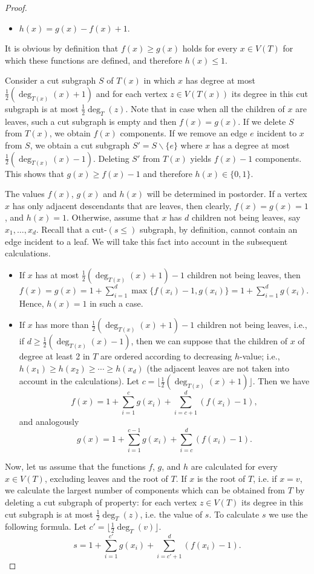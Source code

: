 \documentclass{article}
\theoremstyle{definition}
\begin{document}
\begin{proof}
\begin{itemize}
\item $h(x) = g(x) - f(x) + 1$.
 \end{itemize}
It is obvious by definition that $f(x) \geq g(x)$ holds for every $x \in V(T)$ for which these functions are defined, and therefore $h(x) \leq 1$.

Consider a cut subgraph $S$ of $T(x)$ in which $x$ has degree at most $\frac{1}{2}(\deg_{T(x)}(x)+1)$ and for each vertex $z \in V(T(x))$ its degree in this cut subgraph is at most $\frac{1}{2}\deg_{T}(z)$. Note that in case when all the children of $x$ are leaves, such a cut subgraph is empty and then $f(x) = g(x)$. If we delete $S$ from $T(x)$, we obtain $f(x)$ components. If we remove an edge $e$ incident to $x$ from $S$, we obtain a cut subgraph $S'= S  \backslash \{e\}$ where $x$ has a degree at most $\frac{1}{2}(\deg_{T(x)}(x)-1)$. Deleting $S'$ from $T(x)$ yields $f(x)-1$ components. This shows that $g(x) \geq f(x)-1$ and therefore $h(x) \in \{0,1\}$.

The values $f(x)$, $g(x)$ and $h(x)$ will be determined in postorder. 
If a vertex $x$ has only adjacent descendants that are leaves, then clearly, $f(x)=g(x)=1$, and $h(x)=1$.
Otherwise, assume that $x$ has $d$ children not being leaves, say $x_1,\ldots,x_d$. 
Recall that a cut-$(s \leqslant)$ subgraph, by definition, cannot contain an edge incident to a leaf.
We will take this fact into account in the subsequent calculations.
  \begin{itemize}
      \item If $x$ has at most $\frac{1}{2}(\deg_{T(x)}(x)+1)-1$ children not being leaves, then $f(x)=g(x)=1+\sum_{i=1}^d \max \{f(x_i)-1,g(x_i)\}=1+\sum_{i=1}^d g(x_i)$. Hence, $h(x)=1$ in such a case.
      \item If $x$ has more than $\frac{1}{2}(\deg_{T(x)}(x)+1)-1$ children not being leaves, i.e., if $d \geq \frac{1}{2}(\deg_{T(x)}(x)-1)$, then  we can suppose that the children of $x$ of degree at least 2 in $T$ are ordered according to decreasing $h$-value; i.e., $h(x_1) \geq h(x_2) \geq \cdots \geq h(x_d)$ (the adjacent leaves are not taken into account in the calculations). Let $c=\lfloor\frac{1}{2}(\deg_{T(x)}(x)+1)\rfloor$. Then we have
      $$f(x)=1+\sum_{i=1}^c g(x_i) + \sum_{i=c+1}^d (f(x_i)-1),$$
      and analogously
      $$g(x)=1+\sum_{i=1}^{c-1} g(x_i) +\sum_{i=c}^d (f(x_i)-1).$$
  \end{itemize}
Now, let us assume that the functions $f$, $g$, and $h$ are calculated for every $x \in V(T)$, excluding leaves and the root of $T$. If $x$ is the root of $T$, i.e. if $x=v$, we calculate the largest number of components which can be obtained from $T$ by deleting a cut subgraph of property: for each vertex $z \in V(T)$ its degree in this cut subgraph is at most $ \frac{1}{2}\deg_{T}(z)$, i.e. the value of $s$.
To calculate $s$ we use the following formula. Let $c'=\lfloor \frac{1}{2}\deg_T(v)\rfloor$.
$$
s=1+\sum_{i=1}^{c'} g(x_i) + \sum_{i=c'+1}^d (f(x_i)-1).$$


\end{proof}
\end{document}
